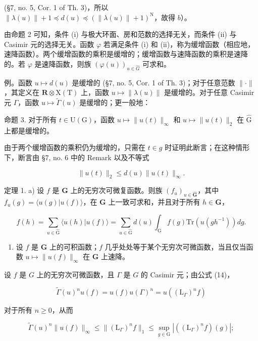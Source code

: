 (§7, no. 5, Cor. 1 of Th. 3)，所以 \(\| \lambda(u) \| + 1 \preccurlyeq d(u) \preccurlyeq (\| \lambda(u) \| + 1)^{\mathrm{N}}\)，故得 \(b\)）。

由命题 2 可知，条件 (i) 与极大环面、房和范数的选择无关，而条件 (ii) 与 Casimir 元的选择无关。函数 \(\varphi\) 若满足条件 (i) 和 (ii)，称为缓增函数（相应地，速降函数）。两个缓增函数的乘积是缓增的；缓增函数与速降函数的乘积是速降的。若 \(\varphi\) 是速降函数，则族 \((\varphi(u))_{u\in\hat{G}}\) 可求和。

例。函数 \(u \mapsto d(u)\) 是缓增的 (§7, no. 5, Cor. 1 of Th. 3)；对于任意范数 \(\| \cdot \|\)，其定义在 \(\mathbf{R} \otimes \mathrm{X(T)}\) 上，函数 \(u \mapsto \| \lambda(u) \|\) 是缓增的。对于任意 Casimir 元 \(\Gamma\)，函数 \(u \mapsto \tilde{\Gamma}(u)\) 是缓增的；更一般地：

命题 3. 对于所有 \(t \in \mathrm{U}(\mathrm{G})\)，函数 \(u \mapsto \| u(t) \|_{\infty}\) 和 \(u \mapsto \| u(t) \|_2\) 在 \(\hat{\mathrm{G}}\) 上都是缓增的。

由于两个缓增函数的乘积仍为缓增的，只需在 \(t \in g\) 时证明此断言；在这种情形下，断言由 §7, no. 6 中的 Remark 以及不等式

\[
\| u (t) \| _ {2} \leq d (u) \| u (t) \| _ {\infty}.
\]

定理 1. a) 设 \(f\) 是 \(\mathbf{G}\) 上的无穷次可微复函数。则族 \((f_u)_{u\in \hat{\mathbf{G}}}\)，其中 \(f_{u}(g) = \langle u(g)|u(f)\rangle\)，在 \(\mathbf{G}\) 上一致可求和，并且对于所有 \(h\in \mathbf{G}\)，

\[
f (h) = \sum_ {u \in \hat {\mathrm{G}}} \langle u (h) | u (f) \rangle = \sum_ {u \in \hat {\mathrm{G}}} d (u) \int_ {\mathrm{G}} f (g) \mathrm{Tr} (u (g h ^ {- 1}))   d g.
\]

\begin{enumerate}
\def\labelenumi{\alph{enumi})}
\setcounter{enumi}{1}
\tightlist
\item
  设 \(f\) 是 \(\mathbf{G}\) 上的可积函数；\(f\) 几乎处处等于某个无穷次可微函数，当且仅当函数 \(u \mapsto \| u(f) \|_{\infty}\) 在 \(\hat{\mathbf{G}}\) 上速降。
\end{enumerate}

设 \(f\) 是 \(G\) 上的无穷次可微函数，且 \(\Gamma\) 是 \(G\) 的 Casimir 元；由公式 (14)，

\[
\tilde {\Gamma} (u) ^ {n} u (f) = u (f) u (\Gamma) ^ {n} = u ((\mathrm{L} _ {\Gamma}) ^ {n} f)
\]

对于所有 \(n \geq 0\)，从而

\[
\tilde {\Gamma} (u) ^ {n} \| u (f) \| _ {\infty} \leq \| (\mathrm{L} _ {\Gamma}) ^ {n} f \| _ {1} \leq \sup _ {g \in \mathrm{G}} | ((\mathrm{L} _ {\Gamma}) ^ {n} f) (g) |;\tag{15}
\]

